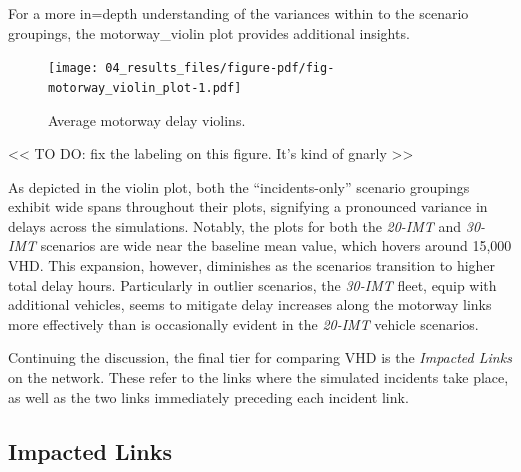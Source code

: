\documentclass[fancy, oneside, mastersfancy, ms]{byuthesis}
\begin{document}
For a more in=depth understanding of the variances within to the
scenario groupings, the motorway\_violin plot provides additional
insights.

\begin{figure}

{\centering \texttt{[image: 04\_results\_files/figure-pdf/fig-motorway\_violin\_plot-1.pdf]}

}

\caption{\label{fig-motorway_violin_plot}Average motorway delay
violins.}

\end{figure}

\textless\textless{} TO DO: fix the labeling on this figure. It's kind
of gnarly \textgreater\textgreater{}

As depicted in the violin plot, both the ``incidents-only'' scenario
groupings exhibit wide spans throughout their plots, signifying a
pronounced variance in delays across the simulations. Notably, the plots
for both the \emph{20-IMT} and \emph{30-IMT} scenarios are wide near the
baseline mean value, which hovers around 15,000 VHD. This expansion,
however, diminishes as the scenarios transition to higher total delay
hours. Particularly in outlier scenarios, the \emph{30-IMT} fleet, equip
with additional vehicles, seems to mitigate delay increases along the
motorway links more effectively than is occasionally evident in the
\emph{20-IMT} vehicle scenarios.

Continuing the discussion, the final tier for comparing VHD is the
\emph{Impacted Links} on the network. These refer to the links where the
simulated incidents take place, as well as the two links immediately
preceding each incident link.

\hypertarget{sec-impacted}{%
\subsection{Impacted Links}\label{sec-impacted}}
\end{document}
